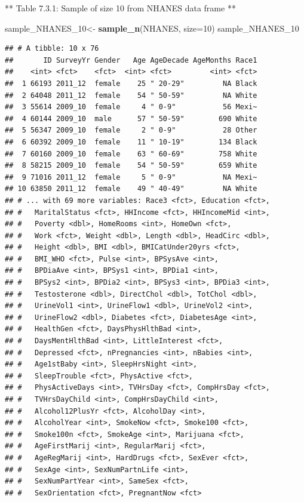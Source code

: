\documentclass[
]{book}
\newenvironment{Shaded}{\begin{snugshade}}{\end{snugshade}}
\newcommand{\DataTypeTok}[1]{\textcolor[rgb]{0.13,0.29,0.53}{#1}}
\newcommand{\DecValTok}[1]{\textcolor[rgb]{0.00,0.00,0.81}{#1}}
\newcommand{\KeywordTok}[1]{\textcolor[rgb]{0.13,0.29,0.53}{\textbf{#1}}}
\newcommand{\NormalTok}[1]{#1}
\newcommand{\StringTok}[1]{\textcolor[rgb]{0.31,0.60,0.02}{#1}}
\begin{document}
** Table 7.3.1: Sample of size 10 from NHANES data frame **

\begin{Shaded}
\begin{Highlighting}[]
\NormalTok{sample_NHANES_}\DecValTok{10}\NormalTok{<-}
\StringTok{  }\KeywordTok{sample_n}\NormalTok{(NHANES, }\DataTypeTok{size=}\DecValTok{10}\NormalTok{)}
\NormalTok{sample_NHANES_}\DecValTok{10}
\end{Highlighting}
\end{Shaded}

\begin{verbatim}
## # A tibble: 10 x 76
##       ID SurveyYr Gender   Age AgeDecade AgeMonths Race1
##    <int> <fct>    <fct>  <int> <fct>         <int> <fct>
##  1 66193 2011_12  female    25 " 20-29"         NA Black
##  2 64048 2011_12  female    54 " 50-59"         NA White
##  3 55614 2009_10  female     4 " 0-9"           56 Mexi~
##  4 60144 2009_10  male      57 " 50-59"        690 White
##  5 56347 2009_10  female     2 " 0-9"           28 Other
##  6 60392 2009_10  female    11 " 10-19"        134 Black
##  7 60160 2009_10  female    63 " 60-69"        758 White
##  8 58215 2009_10  female    54 " 50-59"        659 White
##  9 71016 2011_12  female     5 " 0-9"           NA Mexi~
## 10 63850 2011_12  female    49 " 40-49"         NA White
## # ... with 69 more variables: Race3 <fct>, Education <fct>,
## #   MaritalStatus <fct>, HHIncome <fct>, HHIncomeMid <int>,
## #   Poverty <dbl>, HomeRooms <int>, HomeOwn <fct>,
## #   Work <fct>, Weight <dbl>, Length <dbl>, HeadCirc <dbl>,
## #   Height <dbl>, BMI <dbl>, BMICatUnder20yrs <fct>,
## #   BMI_WHO <fct>, Pulse <int>, BPSysAve <int>,
## #   BPDiaAve <int>, BPSys1 <int>, BPDia1 <int>,
## #   BPSys2 <int>, BPDia2 <int>, BPSys3 <int>, BPDia3 <int>,
## #   Testosterone <dbl>, DirectChol <dbl>, TotChol <dbl>,
## #   UrineVol1 <int>, UrineFlow1 <dbl>, UrineVol2 <int>,
## #   UrineFlow2 <dbl>, Diabetes <fct>, DiabetesAge <int>,
## #   HealthGen <fct>, DaysPhysHlthBad <int>,
## #   DaysMentHlthBad <int>, LittleInterest <fct>,
## #   Depressed <fct>, nPregnancies <int>, nBabies <int>,
## #   Age1stBaby <int>, SleepHrsNight <int>,
## #   SleepTrouble <fct>, PhysActive <fct>,
## #   PhysActiveDays <int>, TVHrsDay <fct>, CompHrsDay <fct>,
## #   TVHrsDayChild <int>, CompHrsDayChild <int>,
## #   Alcohol12PlusYr <fct>, AlcoholDay <int>,
## #   AlcoholYear <int>, SmokeNow <fct>, Smoke100 <fct>,
## #   Smoke100n <fct>, SmokeAge <int>, Marijuana <fct>,
## #   AgeFirstMarij <int>, RegularMarij <fct>,
## #   AgeRegMarij <int>, HardDrugs <fct>, SexEver <fct>,
## #   SexAge <int>, SexNumPartnLife <int>,
## #   SexNumPartYear <int>, SameSex <fct>,
## #   SexOrientation <fct>, PregnantNow <fct>
\end{verbatim}
\end{document}
